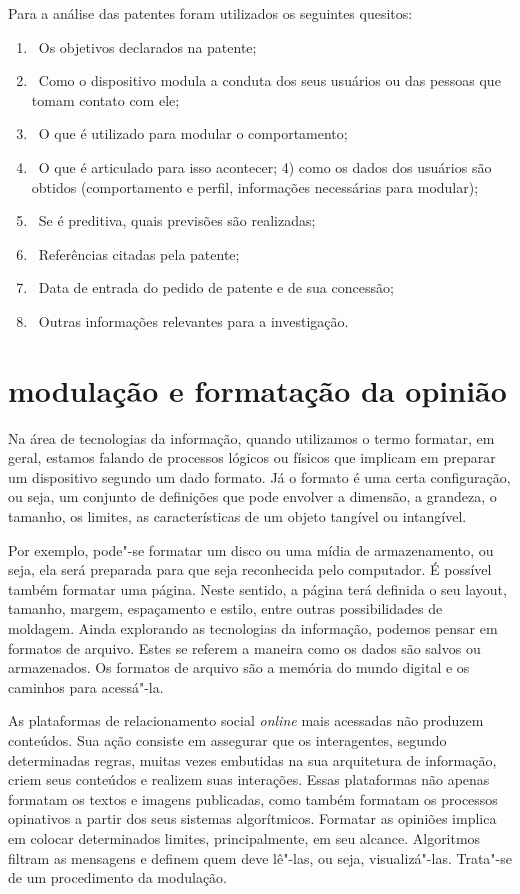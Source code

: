 Para a análise das patentes foram utilizados os seguintes quesitos: 

\begin{enumerate}
\item\, Os objetivos declarados na patente;
\item\, Como o dispositivo modula a conduta dos seus usuários ou das pessoas que tomam contato com ele;
\item\, O que é utilizado para modular o comportamento;
\item\, O que é articulado para isso acontecer; 4) como os dados dos usuários são obtidos (comportamento e perfil, informações necessárias para modular);
\item\, Se é preditiva, quais previsões são realizadas;
\item\, Referências citadas pela patente; 
\item\, Data de entrada do pedido de patente e de sua concessão;
\item\, Outras informações relevantes para a investigação.
\end{enumerate}

\section{modulação e formatação da opinião}

Na área de tecnologias da informação, quando utilizamos o termo
formatar, em geral, estamos falando de processos lógicos ou físicos que
implicam em preparar um dispositivo segundo um dado formato. Já o
formato é uma certa configuração, ou seja, um conjunto de definições que
pode envolver a dimensão, a grandeza, o tamanho, os limites, as
características de um objeto tangível ou intangível.

Por exemplo, pode"-se formatar um disco ou uma mídia de armazenamento, ou
seja, ela será preparada para que seja reconhecida pelo computador. É
possível também formatar uma página. Neste sentido, a página terá
definida o seu layout, tamanho, margem, espaçamento e estilo, entre
outras possibilidades de moldagem. Ainda explorando as tecnologias da
informação, podemos pensar em formatos de arquivo. Estes se referem a
maneira como os dados são salvos ou armazenados. Os formatos de arquivo
são a memória do mundo digital e os caminhos para acessá"-la.

As plataformas de relacionamento social \textit{online} mais acessadas não
produzem conteúdos. Sua ação consiste em assegurar que os interagentes,
segundo determinadas regras, muitas vezes embutidas na sua arquitetura
de informação, criem seus conteúdos e realizem suas interações. Essas
plataformas não apenas formatam os textos e imagens publicadas, como
também formatam os processos opinativos a partir dos seus sistemas
algorítmicos. Formatar as opiniões implica em colocar determinados
limites, principalmente, em seu alcance. Algoritmos filtram as mensagens
e definem quem deve lê"-las, ou seja, visualizá"-las. Trata"-se de um
procedimento da modulação.

